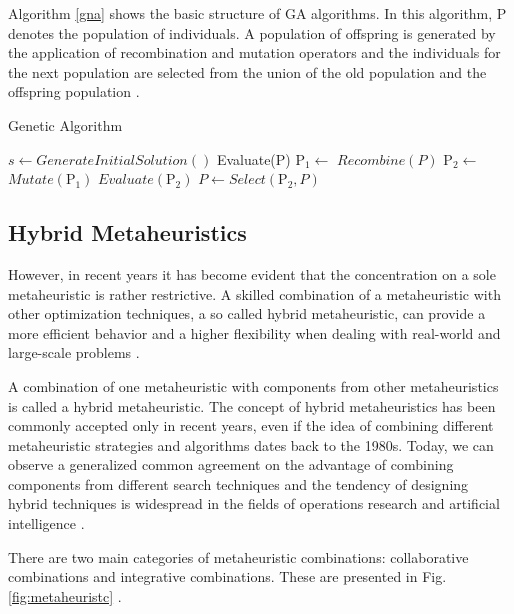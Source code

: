 Algorithm \ref{gna} shows the basic structure of GA algorithms. In this algorithm, P denotes the population of individuals. A population of offspring is generated by the application of recombination and mutation operators and the individuals for the next population are selected from the union of the old population and the offspring population \cite{raidl2010metaheuristic}.


\begin{algorithm}[h]
  \caption{Genetic Algorithm}\label{gna}
  \begin{algorithmic}[3]
    
    \State $s\gets GenerateInitialSolution()$
    \State Evaluate(P)
    \State $\mbox{P}_1\gets$ $Recombine(P)$
    \State $\mbox{P}_2\gets$ $Mutate(\mbox{P}_1)$ 
    \State $Evaluate(\mbox{P}_2)$
    \State $P\gets Select(\mbox{P}_2,P)$
    \EndWhile
      
  \end{algorithmic}
\end{algorithm}

\subsection{Hybrid  Metaheuristics}

However, in recent years it has become evident that the concentration on a sole metaheuristic is rather restrictive. A skilled combination of a metaheuristic with other optimization techniques, a so called hybrid metaheuristic, can provide a more efficient behavior
and a higher flexibility when dealing with real-world and large-scale problems \cite{Talbi2012}.

A combination of one metaheuristic with components from other metaheuristics is called a hybrid metaheuristic. The concept of hybrid metaheuristics has been commonly accepted only in recent years, even if the idea of combining different metaheuristic strategies and algorithms dates back to the 1980s. Today, we can observe a generalized common agreement on the advantage of combining components from different search techniques and the tendency of designing hybrid techniques is widespread in the fields of operations research and artificial intelligence \cite{raidl2010metaheuristic}. 


There are two main categories of metaheuristic combinations: collaborative combinations and integrative combinations. These are presented in Fig. \ref{fig:metaheuristc} \cite{Raidl2006}.


